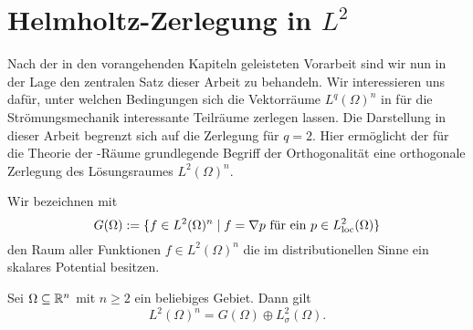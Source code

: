 \chapter{Helmholtz-Zerlegung in $L^2$}

Nach der in den vorangehenden Kapiteln geleisteten Vorarbeit sind wir nun in der Lage den zentralen Satz dieser Arbeit zu behandeln.
Wir interessieren uns dafür, unter welchen Bedingungen sich die Vektorräume $L^q(\Omega)^n$ in für die Strömungsmechanik interessante Teilräume zerlegen lassen.
Die Darstellung in dieser Arbeit begrenzt sich auf die Zerlegung für $q = 2$.
Hier ermöglicht der für die Theorie der \hilbert\hyp{}Räume grundlegende Begriff der Orthogonalität eine orthogonale Zerlegung des Lösungsraumes $L^2(\Omega)^n$.

Wir bezeichnen mit 
$$
G(\Omega) := \{f \in L^2(\Omega)^n \mid f = \nabla p \text{ für ein } p \in L^2_{\operatorname{loc}}(\Omega)\}
$$
den Raum aller Funktionen $f \in L^2(\Omega)^n$ die im distributionellen Sinne ein skalares Potential besitzen.

\begin{lem}
  \label{lem:helmholtz}
  Sei $\Omega \subseteq \mathbb{R}^n$ mit $n \geq 2$ ein beliebiges Gebiet.
  Dann gilt
  $$
  L^2(\Omega)^n = G(\Omega) \oplus L^2_\sigma(\Omega).
  $$
\end{lem}

